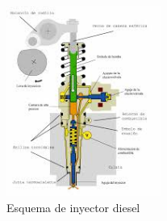 \documentclass[a4paper,12pt,oneside]{book}
\begin{document}
\begin{figure}[htbp]
\centering
\includegraphics[width=0.45\textwidth]{./img_0009/inyector.jpg}
\caption{Esquema de inyector diesel}
\end{figure}
\newpage
\end{document}
